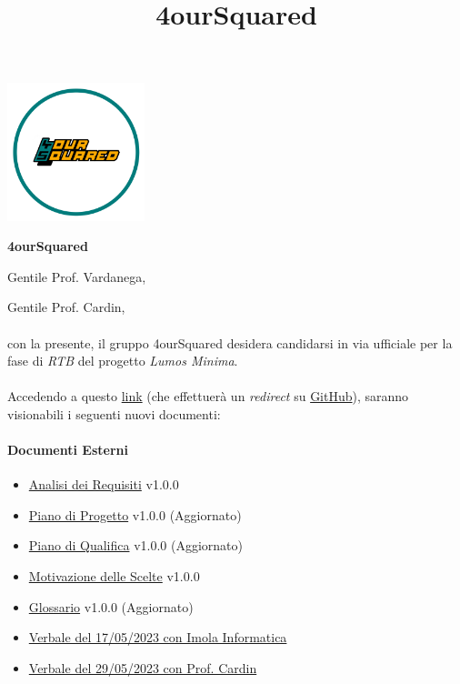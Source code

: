 \documentclass[12pt, a4paper]{article}
\begin{document}
\graphicspath{ {../../template} }
\title{4ourSquared}
\begin{center}
    \includegraphics[width=0.30\textwidth]{4ourSquared_logo}
\end{center}
\begin{center}
    {\Large \textbf{4ourSquared}}\\[24pt]
\end{center}


Gentile Prof. Vardanega,


Gentile Prof. Cardin,\\\\
con la presente, il gruppo 4ourSquared desidera candidarsi in via ufficiale per la fase di \textit{RTB} del progetto \textit{Lumos Minima}.\\\\
Accedendo a questo \href{https://github.com/4ourSquared/LumosMinima/tree/main/public}{link} (che effettuerà un \textit{redirect} su \href{https://github.com/}{GitHub}), saranno visionabili i seguenti nuovi documenti:
\paragraph{Documenti Esterni}
\begin{itemize}
    \item \href{https://github.com/4ourSquared/LumosMinima/tree/main/public/esterni/analisi_dei_requisiti_v1.0.0.pdf}{Analisi dei Requisiti} v1.0.0
    \item \href{https://github.com/4ourSquared/LumosMinima/tree/main/public/esterni/piano_di_progetto_v1.0.0.pdf}{Piano di Progetto} v1.0.0 (Aggiornato)
    \item \href{https://github.com/4ourSquared/LumosMinima/tree/main/public/esterni/piano_di_qualifica_v1.0.0.pdf}{Piano di Qualifica} v1.0.0 (Aggiornato)
    \item \href{https://github.com/4ourSquared/LumosMinima/tree/main/public/esterni/motivazione_scelte_v1.0.0.pdf}{Motivazione delle Scelte} v1.0.0
    \item \href{https://github.com/4ourSquared/LumosMinima/tree/main/public/esterni/glossario_v1.0.0.pdf}{Glossario} v1.0.0 (Aggiornato)
    \item \href{https://github.com/4ourSquared/LumosMinima/tree/main/public/esterni/verbali/2023_05_17_E.pdf}{Verbale del 17/05/2023 con Imola Informatica}
    \item \href{https://github.com/4ourSquared/LumosMinima/tree/main/public/esterni/verbali/2023_05_29_E.pdf}{Verbale del 29/05/2023 con Prof. Cardin}
\end{itemize}
\end{document}

